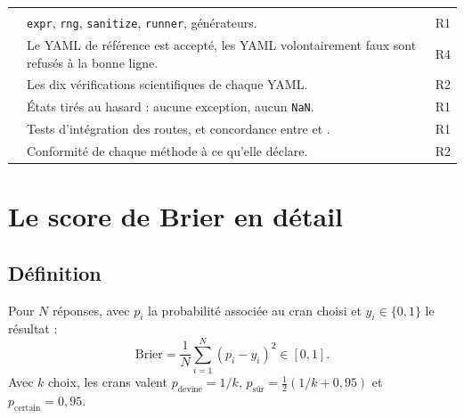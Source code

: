 \documentclass[11pt,a4paper]{article}
\begin{document}
\begin{appendices}
\begin{longtable}{@{}L{6.4cm} >{\raggedright\arraybackslash}p{\dimexpr\textwidth-7.9cm-4\tabcolsep\relax} L{1.5cm}@{}}
   \\
   & \texttt{expr}, \texttt{rng}, \texttt{sanitize}, \texttt{runner}, générateurs. & R1 \\
   & Le YAML de référence est accepté, les YAML volontairement faux sont refusés à la bonne ligne. & R4 \\
   & Les dix vérifications scientifiques de chaque YAML. & R2 \\
   & États tirés au hasard : aucune exception, aucun \texttt{NaN}. & R1 \\
   & Tests d'intégration des routes, et concordance entre  et . & R1 \\
   & Conformité de chaque méthode à ce qu'elle déclare. & R2 \\
\end{longtable}
\renewcommand{\arraystretch}{1.0}

\newpage
\section{Le score de Brier en détail}\label{ann:brier}

\subsection{Définition}
Pour $N$ réponses, avec $p_i$ la probabilité associée au cran choisi et $y_i \in \{0,1\}$ le résultat :
\[
  \mathrm{Brier} = \frac{1}{N} \sum_{i=1}^{N} (p_i - y_i)^2 \in [0, 1].
\]
Avec $k$ choix, les crans valent $p_{\text{devine}} = 1/k$, $p_{\text{sûr}} = \tfrac{1}{2}\left(1/k + 0{,}95\right)$ et $p_{\text{certain}} = 0{,}95$.


\end{appendices}
\end{document}
